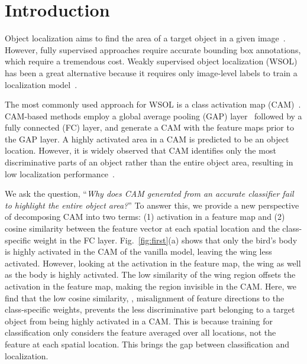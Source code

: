 \section{Introduction}
\label{sec:intro}
Object localization aims to find the area of a target object in a given image~\cite{ren2015faster,russakovsky2015imagenet,duan2019centernet,lin2017feature,tan2020efficientdet}. However, fully supervised approaches require accurate bounding box annotations, which require a tremendous cost. Weakly supervised object localization (WSOL) has been a great alternative because it requires only image-level labels to train a localization model~\cite{singh2017hide,choe2019attention,choe2020evaluation,pan2021unveiling, xue2019danet}.

The most commonly used approach for WSOL is a class activation map (CAM)~\cite{zhou2016learning}. CAM-based methods employ a global average pooling (GAP) layer~\cite{lin2013network} followed by a fully connected (FC) layer, and generate a CAM with the feature maps prior to the GAP layer.
A highly activated area in a CAM is predicted to be an object location.
However, it is widely observed that CAM identifies only the most discriminative parts of an object rather than the entire object area, resulting in low localization performance~\cite{mai2020erasing,lee2021anti,zhang2018adversarial}.



We ask the question, ``\textit{Why does CAM generated from an accurate classifier fail to highlight the entire object area?}''
To answer this, we provide a new perspective of decomposing CAM into two terms: (1) activation in a feature map and (2) cosine similarity between the feature vector at each spatial location and the class-specific weight in the FC layer.
Fig.~\ref{fig:first}(a) shows that only the bird's body is highly activated in the CAM of the vanilla model, leaving the wing less activated. However, looking at the activation in the feature map, the wing as well as the body is highly activated.
The low similarity of the wing region offsets the activation in the feature map, making the region invisible in the CAM.
Here, we find that the low cosine similarity, \ie, misalignment of feature directions to the class-specific weights, prevents the less discriminative part belonging to a target object from being highly activated in a CAM.
This is because training for classification only considers the feature averaged over all locations, not the feature at each spatial location.
This brings the gap between classification and localization.

